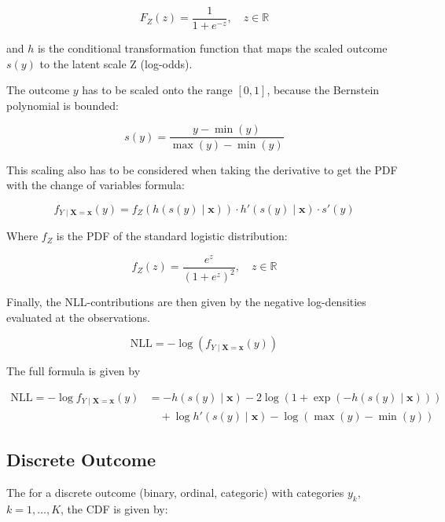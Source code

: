 \begin{equation}
F_Z(z) = \frac{1}{1 + e^{-z}}, \quad z \in \mathbb{R}
\end{equation}

and \( h \) is the conditional transformation function that maps the scaled outcome \( s(y) \) to the latent scale Z (log-odds).

The outcome $y$ has to be scaled onto the range $[0, 1]$, because the Bernstein polynomial is bounded:

\begin{equation}
s(y) = \frac{y - \min(y)}{\max(y) - \min(y)}
\end{equation}

This scaling also has to be considered when taking the derivative to get the PDF with the change of variables formula:

\begin{equation}
f_{Y \mid \mathbf{X} = \mathbf{x}}(y) = f_Z(h(s(y) \mid \mathbf{x})) \cdot h'(s(y) \mid \mathbf{x}) \cdot s'(y)
\end{equation}

Where $f_Z$ is the PDF of the standard logistic distribution:

\begin{equation}
f_Z(z) = \frac{e^{z}}{(1 + e^{z})^2}, \quad z \in \mathbb{R}
\end{equation}

Finally, the NLL-contributions are then given by the negative log-densities evaluated at the observations.

\begin{equation}
\text{NLL} = - \log (f_{Y \mid \mathbf{X} = \mathbf{x}}(y))
\end{equation}

The full formula is given by

\begin{align}
\text{NLL} = - \log f_{Y \mid \mathbf{X} = \mathbf{x}}(y)
&= -h(s(y) \mid \mathbf{x}) - 2 \log(1 + \exp(-h(s(y) \mid \mathbf{x}))) \nonumber \\
&\quad + \log h'(s(y) \mid \mathbf{x}) - \log(\max(y) - \min(y))
\end{align}




\subsection{Discrete Outcome}


The for a discrete outcome (binary, ordinal, categoric) with categories $y_k$, $k = 1, \ldots, K$, the CDF is given by:

